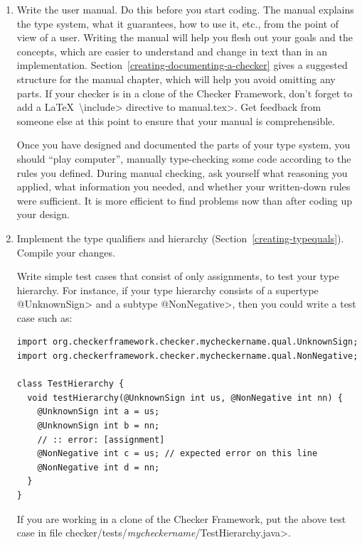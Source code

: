 \begin{enumerate}
\item
\label{creating-tips-write-manual}
  Write the user manual.  Do this before you start coding.  The manual
  explains the type system, what it guarantees, how to use it, etc., from
  the point of view of a user.  Writing the manual will help you flesh out
  your goals and the concepts, which are easier to understand and change in
  text than in an implementation.
  Section~\ref{creating-documenting-a-checker} gives a suggested structure
  for the manual chapter, which will help you avoid omitting any parts.
  If your checker is in a clone of the Checker Framework, don't forget to
  add a \LaTeX\ \<\textbackslash{}include> directive to \<manual.tex>.
  Get feedback from someone else at this point to ensure that your manual
  is comprehensible.

  Once you have designed and documented the parts of your type system, you
  should ``play computer'', manually
  type-checking some code according to the rules you defined.
  During manual checking, ask
  yourself what reasoning you applied, what information you needed, and
  whether your written-down rules were sufficient.
  It is more efficient to find problems now than after coding up
  your design.

\item
\label{creating-tips-implement-qualifiers}
  Implement the type qualifiers and hierarchy
  (Section~\ref{creating-typequals}).
  Compile your changes.

  Write simple test cases that consist of only assignments,
  to test your type hierarchy.  For instance, if
  your type hierarchy consists of a supertype \<@UnknownSign> and a subtype
  \<@NonNegative>, then you could write a test case such as:

\begin{Verbatim}
import org.checkerframework.checker.mycheckername.qual.UnknownSign;
import org.checkerframework.checker.mycheckername.qual.NonNegative;

class TestHierarchy {
  void testHierarchy(@UnknownSign int us, @NonNegative int nn) {
    @UnknownSign int a = us;
    @UnknownSign int b = nn;
    // :: error: [assignment]
    @NonNegative int c = us; // expected error on this line
    @NonNegative int d = nn;
  }
}
\end{Verbatim}

  If you are working in a clone of the Checker Framework, put the above
  test case in file \<checker/tests/\emph{mycheckername}/TestHierarchy.java>.


\end{enumerate}
